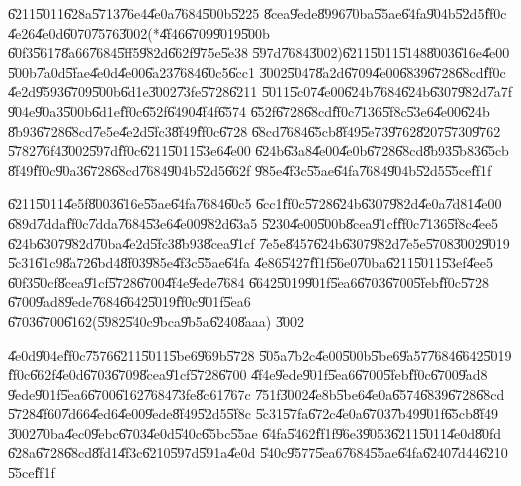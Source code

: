 \documentclass{article}
\begin{document}
\U{6211}\U{5011}\U{628a}\U{5713}\U{76e4}\U{4e0a}\U{7684}\U{500b}\U{5225}%
\U{8cea}\U{9ede}\U{8996}\U{70ba}\U{55ae}\U{64fa}\U{904b}\U{52d5}\U{ff0c}%
\U{4e26}\U{4e0d}\U{6070}\U{7576}\U{3002}(*\U{4f46}\U{6709}\U{9019}\U{500b}%
\U{60f3}\U{5617}\U{8a66}\U{7684}\U{5ff5}\U{982d}\U{662f}\U{975e}\U{5e38}%
\U{597d}\U{7684}\U{3002})\U{6211}\U{5011}\U{5148}\U{8003}\U{616e}\U{4e00}%
\U{500b}\U{7a0d}\U{5fae}\U{4e0d}\U{4e00}\U{6a23}\U{7684}\U{60c5}\U{6cc1}%
\U{3002}\U{5047}\U{8a2d}\U{6709}\U{4e00}\U{6839}\U{6728}\U{68cd}\U{ff0c}%
\U{4e2d}\U{9593}\U{6709}\U{500b}\U{6d1e}\U{3002}\U{73fe}\U{5728}\U{6211}%
\U{5011}\U{5c07}\U{4e00}\U{624b}\U{7684}\U{624b}\U{6307}\U{982d}\U{7a7f}%
\U{904e}\U{90a3}\U{500b}\U{6d1e}\U{ff0c}\U{652f}\U{6490}\U{4f4f}\U{6574}%
\U{652f}\U{6728}\U{68cd}\U{ff0c}\U{7136}\U{5f8c}\U{53e6}\U{4e00}\U{624b}%
\U{8b93}\U{6728}\U{68cd}\U{7e5e}\U{4e2d}\U{5fc3}\U{8f49}\U{ff0c}\U{6728}%
\U{68cd}\U{7684}\U{65cb}\U{8f49}\U{5e73}\U{9762}\U{8207}\U{5730}\U{9762}%
\U{5782}\U{76f4}\U{3002}\U{597d}\U{ff0c}\U{6211}\U{5011}\U{53e6}\U{4e00}%
\U{624b}\U{63a8}\U{4e00}\U{4e0b}\U{6728}\U{68cd}\U{8b93}\U{5b83}\U{65cb}%
\U{8f49}\U{ff0c}\U{90a3}\U{6728}\U{68cd}\U{7684}\U{904b}\U{52d5}\U{662f}%
\U{985e}\U{4f3c}\U{55ae}\U{64fa}\U{7684}\U{904b}\U{52d5}\U{55ce}\U{ff1f}

\U{6211}\U{5011}\U{4e5f}\U{8003}\U{616e}\U{55ae}\U{64fa}\U{7684}\U{60c5}%
\U{6cc1}\U{ff0c}\U{5728}\U{624b}\U{6307}\U{982d}\U{4e0a}\U{7d81}\U{4e00}%
\U{689d}\U{7dda}\U{ff0c}\U{7dda}\U{7684}\U{53e6}\U{4e00}\U{982d}\U{63a5}%
\U{5230}\U{4e00}\U{500b}\U{8cea}\U{91cf}\U{ff0c}\U{7136}\U{5f8c}\U{4ee5}%
\U{624b}\U{6307}\U{982d}\U{70ba}\U{4e2d}\U{5fc3}\U{8b93}\U{8cea}\U{91cf}%
\U{7e5e}\U{8457}\U{624b}\U{6307}\U{982d}\U{7e5e}\U{5708}\U{3002}\U{9019}%
\U{5c31}\U{61c9}\U{8a72}\U{6bd4}\U{8f03}\U{985e}\U{4f3c}\U{55ae}\U{64fa}%
\U{4e86}\U{5427}\U{ff1f}\U{56e0}\U{70ba}\U{6211}\U{5011}\U{53ef}\U{4ee5}%
\U{60f3}\U{50cf}\U{8cea}\U{91cf}\U{5728}\U{6700}\U{4f4e}\U{9ede}\U{7684}%
\U{6642}\U{5019}\U{901f}\U{5ea6}\U{6703}\U{6700}\U{5feb}\U{ff0c}\U{5728}%
\U{6700}\U{9ad8}\U{9ede}\U{7684}\U{6642}\U{5019}\U{ff0c}\U{901f}\U{5ea6}%
\U{6703}\U{6700}\U{6162}(\U{5982}\U{540c}\U{9bca}\U{9b5a}\U{6240}\U{8aaa})%
\U{3002}

\U{4e0d}\U{904e}\U{ff0c}\U{7576}\U{6211}\U{5011}\U{5be6}\U{969b}\U{5728}%
\U{505a}\U{7b2c}\U{4e00}\U{500b}\U{5be6}\U{9a57}\U{7684}\U{6642}\U{5019}%
\U{ff0c}\U{662f}\U{4e0d}\U{6703}\U{6709}\U{8cea}\U{91cf}\U{5728}\U{6700}%
\U{4f4e}\U{9ede}\U{901f}\U{5ea6}\U{6700}\U{5feb}\U{ff0c}\U{6700}\U{9ad8}%
\U{9ede}\U{901f}\U{5ea6}\U{6700}\U{6162}\U{7684}\U{73fe}\U{8c61}\U{767c}%
\U{751f}\U{3002}\U{4e8b}\U{5be6}\U{4e0a}\U{6574}\U{6839}\U{6728}\U{68cd}%
\U{5728}\U{4f60}\U{7d66}\U{4ed6}\U{4e00}\U{9ede}\U{8f49}\U{52d5}\U{5f8c}%
\U{5c31}\U{57fa}\U{672c}\U{4e0a}\U{6703}\U{7b49}\U{901f}\U{65cb}\U{8f49}%
\U{3002}\U{70ba}\U{4ec0}\U{9ebc}\U{6703}\U{4e0d}\U{540c}\U{65bc}\U{55ae}%
\U{64fa}\U{5462}\U{ff1f}\U{96e3}\U{9053}\U{6211}\U{5011}\U{4e0d}\U{80fd}%
\U{628a}\U{6728}\U{68cd}\U{8fd1}\U{4f3c}\U{6210}\U{597d}\U{591a}\U{4e0d}%
\U{540c}\U{9577}\U{5ea6}\U{7684}\U{55ae}\U{64fa}\U{6240}\U{7d44}\U{6210}%
\U{55ce}\U{ff1f}
\end{document}
